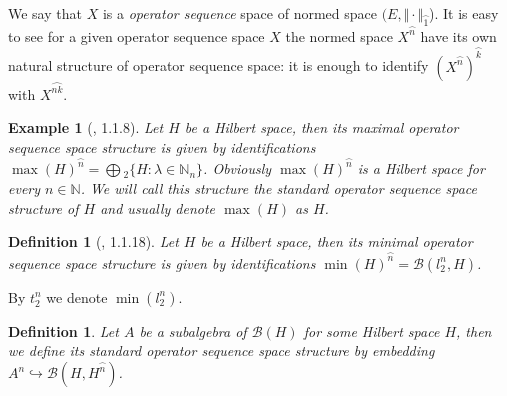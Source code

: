 \documentclass[12pt]{article}
\newtheorem{definition}[theorem]{Definition}
\newtheorem{example}[theorem]{Example}
\begin{document}
We say that $X$ is a \textit{operator sequence} space of normed space $(E, \Vert \cdot \Vert_{\wideparen{1}}$). It is easy to see for a given operator sequence space $X$ the normed space $X^{\wideparen{n}}$ have its own natural structure of operator sequence space: it is enough to identify $(X^{\wideparen{n}})^{\wideparen{k}}$ with $X^{\wideparen{nk}}$.

\begin{example}[\cite{LamOpFolgen}, 1.1.8]\label{ExHilSQ} Let $H$ be a Hilbert space, then its maximal operator sequence space structure is given by identifications $\max(H)^{\wideparen{n}}=\bigoplus{}_2\{H:\lambda\in\mathbb{N}_n\}$. Obviously $\max(H)^{\wideparen{n}}$ is a Hilbert space for every $n\in\mathbb{N}$. We will call this structure the standard operator sequence space structure of $H$ and usually denote $\max(H)$ as $H$.
\end{example}

\begin{definition}[\cite{LamOpFolgen}, 1.1.18]\label{ExT2nSQ} 
Let $H$ be a Hilbert space, then its minimal operator sequence space structure is given by identifications $\min(H)^{\wideparen{n}} = \mathcal{B}(l_2^n,H)$. 
\end{definition}

By $t_2^n$ we denote $\min(l_2^n)$.

\begin{definition}\label{DefOpSubAlgSQ} Let $A$ be a subalgebra of $\mathcal{B}(H)$ for some Hilbert space $H$, then we define its standard operator sequence space structure by embedding $A^n\hookrightarrow \mathcal{B}(H,H^{\wideparen{n}})$.
\end{definition}
\end{document}

